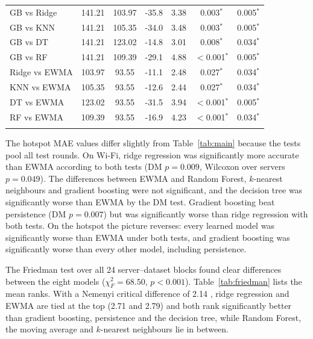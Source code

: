 \documentclass[pdflatex,sn-mathphys-num]{sn-jnl}
\begin{document}
\begin{table}[h]
\begin{tabular}{@{}lcccccc@{}}
GB vs Ridge & 141.21 & 103.97 & -35.8 & 3.38 & 0.003$^{*}$ & 0.005$^{*}$ \\
GB vs KNN & 141.21 & 105.35 & -34.0 & 3.48 & 0.003$^{*}$ & 0.005$^{*}$ \\
GB vs DT & 141.21 & 123.02 & -14.8 & 3.01 & 0.008$^{*}$ & 0.034$^{*}$ \\
GB vs RF & 141.21 & 109.39 & -29.1 & 4.88 & $<$0.001$^{*}$ & 0.005$^{*}$ \\
Ridge vs EWMA & 103.97 & 93.55 & -11.1 & 2.48 & 0.027$^{*}$ & 0.034$^{*}$ \\
KNN vs EWMA & 105.35 & 93.55 & -12.6 & 2.44 & 0.027$^{*}$ & 0.034$^{*}$ \\
DT vs EWMA & 123.02 & 93.55 & -31.5 & 3.94 & $<$0.001$^{*}$ & 0.005$^{*}$ \\
RF vs EWMA & 109.39 & 93.55 & -16.9 & 4.23 & $<$0.001$^{*}$ & 0.034$^{*}$ \\
\botrule
\end{tabular}
\end{table}

The hotspot MAE values differ slightly from Table~\ref{tab:main} because the tests pool all test rounds. On Wi-Fi, ridge regression was significantly more accurate than EWMA according to both tests (DM $p = 0.009$, Wilcoxon over servers $p = 0.049$). The differences between EWMA and Random Forest, $k$-nearest neighbours and gradient boosting were not significant, and the decision tree was significantly worse than EWMA by the DM test. Gradient boosting beat persistence (DM $p = 0.007$) but was significantly worse than ridge regression with both tests. On the hotspot the picture reverses: every learned model was significantly worse than EWMA under both tests, and gradient boosting was significantly worse than every other model, including persistence.

The Friedman test over all 24 server--dataset blocks found clear differences between the eight models ($\chi^2_F = 68.50$, $p < 0.001$). Table~\ref{tab:friedman} lists the mean ranks. With a Nemenyi critical difference of 2.14 \cite{demsar2006stat}, ridge regression and EWMA are tied at the top (2.71 and 2.79) and both rank significantly better than gradient boosting, persistence and the decision tree, while Random Forest, the moving average and $k$-nearest neighbours lie in between.
\end{document}
